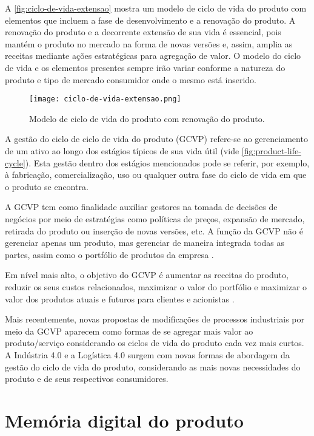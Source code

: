 	A \autoref{fig:ciclo-de-vida-extensao} mostra um modelo de ciclo de vida do produto com elementos que incluem a fase de desenvolvimento e a renovação do produto. A renovação do produto e a decorrente extensão de sua vida é essencial, pois mantém o produto no mercado na forma de novas versões e, assim, amplia as receitas mediante ações estratégicas para agregação de valor. O modelo do ciclo de vida e os elementos presentes sempre irão variar conforme a natureza do produto e tipo de mercado consumidor onde o mesmo está inserido.
	
	\begin{figure}[htb]
		\centering
		\caption{Modelo de ciclo de vida do produto com renovação do produto.}
		\label{fig:ciclo-de-vida-extensao}
		\texttt{[image: ciclo-de-vida-extensao.png]}
	\end{figure}
	
	A gestão do ciclo de ciclo de vida do produto (GCVP) refere-se ao gerenciamento de um ativo ao longo dos estágios típicos de sua vida útil (vide \autoref{fig:product-life-cycle}). Esta gestão dentro dos estágios mencionados pode se referir, por exemplo, à fabricação, comercialização, uso ou qualquer outra fase do ciclo de vida em que o produto se encontra. 
	
	A GCVP tem como finalidade auxiliar gestores na tomada de decisões de negócios por meio de estratégias como políticas de preços, expansão de mercado, retirada do produto ou inserção de novas versões, etc. A função da GCVP não é gerenciar apenas um produto, mas gerenciar de maneira integrada todas as partes, assim como o portfólio de produtos da empresa \cite{stark2015lifecycle}.
	
	Em nível mais alto, o objetivo do GCVP é aumentar as receitas do produto, reduzir os seus custos relacionados, maximizar o valor do portfólio e maximizar o valor dos produtos atuais e futuros para clientes e acionistas \cite{stark2015lifecycle}.
	
	Mais recentemente, novas propostas de modificações de processos industriais por meio da GCVP aparecem como formas de se agregar mais valor ao produto/serviço considerando os ciclos de vida do produto cada vez mais curtos. A Indústria 4.0 e a Logística 4.0 surgem com novas formas de abordagem da gestão do ciclo de vida do produto, considerando as mais novas necessidades do produto e de seus respectivos consumidores.

\section{Memória digital do produto}

